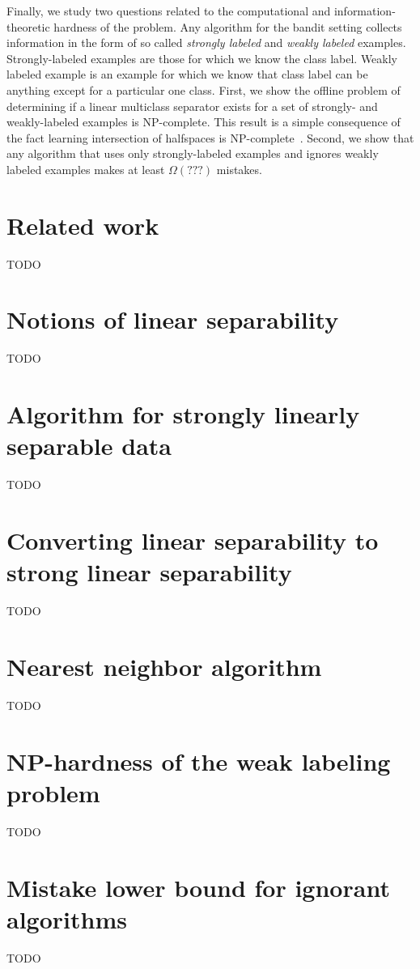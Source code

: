 \documentclass[12pt]{article}
\begin{document}
Finally, we study two questions related to the computational and
information-theoretic hardness of the problem. Any algorithm for the bandit
setting collects information in the form of so called \emph{strongly labeled}
and \emph{weakly labeled} examples. Strongly-labeled examples are those for
which we know the class label. Weakly labeled example is an example for which we
know that class label can be anything except for a particular one class. First,
we show the offline problem of determining if a linear multiclass separator
exists for a set of strongly- and weakly-labeled examples is NP-complete. This
result is a simple consequence of the fact learning intersection of halfspaces
is NP-complete~\citep{Blum-Rivest-1993}. Second, we show that any algorithm that
uses only strongly-labeled examples and ignores weakly labeled examples makes at
least $\Omega(???)$ mistakes.


\section{Related work}
\label{section:related-work}

TODO


\section{Notions of linear separability}
\label{section:notions-of-linear-separability}

TODO


\section{Algorithm for strongly linearly separable data}

TODO


\section{Converting linear separability to strong linear separability}

TODO


\section{Nearest neighbor algorithm}

TODO


\section{NP-hardness of the weak labeling problem}

TODO


\section{Mistake lower bound for ignorant algorithms}

TODO





\end{document}
